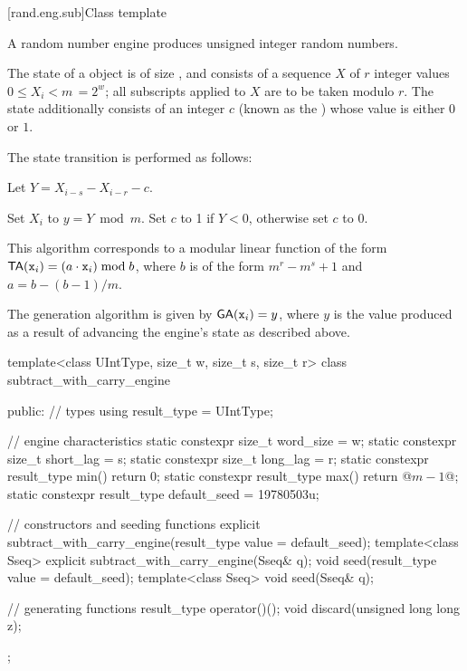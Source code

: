 [rand.eng.sub]{Class template }%
%

\pnum
A  random number engine
produces unsigned integer random numbers.

\pnum
The state%
%
of a  object 
is of size
,
and consists of
a sequence $X$ of $r$ integer values $0 \leq X_i < m \,= 2^w$;
all subscripts applied to $X$ are to be taken modulo $r$.
The state 
additionally consists of an integer $c$
(known as the )%
%
whose value is either $0$ or $1$.

\pnum
The state transition%
%
is performed as follows:
\begin{enumeratea}
 \item
   Let $ Y = X_{i-s} - X_{i-r} - c $.
 \item
   Set $X_i$ to $ y = Y \bmod m $.
   Set $c$ to 1 if $Y < 0$,
   otherwise set $c$ to 0.
\end{enumeratea}
\begin{note}
 This algorithm corresponds
 to a modular linear function
 of the form
 $ \mathsf{TA}(\texttt{x}_{i}) = (a \cdot \texttt{x}_{i}) \bmod b $,
 where $b$ is of the form
 $ m^r - m^s + 1 $
 and $ a = b - (b-1) / m $.
\end{note}

\pnum
The generation algorithm%
%
is given by
$ \mathsf{GA}(\texttt{x}_{i}) = y $,
where
 $y$
is the value produced
as a result
of advancing the engine's state
as described above.

\begin{codeblock}
template<class UIntType, size_t w, size_t s, size_t r>
 class subtract_with_carry_engine
{
public:
 // types
 using result_type = UIntType;

 // engine characteristics
 static constexpr size_t word_size = w;
 static constexpr size_t short_lag = s;
 static constexpr size_t long_lag = r;
 static constexpr result_type min() { return 0; }
 static constexpr result_type max() { return @$m - 1$@; }
 static constexpr result_type default_seed = 19780503u;

 // constructors and seeding functions
 explicit subtract_with_carry_engine(result_type value = default_seed);
 template<class Sseq> explicit subtract_with_carry_engine(Sseq& q);
 void seed(result_type value = default_seed);
 template<class Sseq> void seed(Sseq& q);

 // generating functions
 result_type operator()();
 void discard(unsigned long long z);
};
\end{codeblock}


